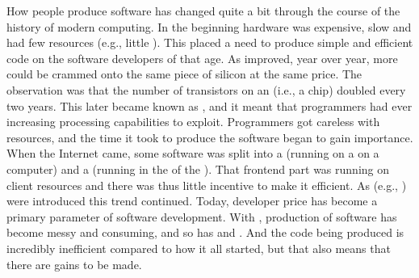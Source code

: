 How people produce software has changed quite a bit through the course of the history of modern computing. In the beginning hardware was expensive, slow and had few resources (e.g., little ). This placed a need to produce simple and efficient code on the software developers of that age. As  improved, year over year, more  could be crammed onto the same piece of silicon at the same price\cite{moore1965}. The observation was that the number of transistors on an  (i.e., a chip) doubled every two years. This later became known as , and it meant that programmers had ever increasing processing capabilities to exploit. Programmers got careless with resources, and the time it took to produce the software began to gain importance. When the Internet came, some software was split into a  (running on a  on a  computer) and a  (running in the  of the ). That frontend part was running on client resources and there was thus little incentive to make it efficient. As  (e.g., ) were introduced this trend continued. Today, developer price has become a primary parameter of software development. With , production of software has become messy and  consuming, and so has  and . And the code being produced is incredibly inefficient compared to how it all started, but that also means that there are gains to be made.

